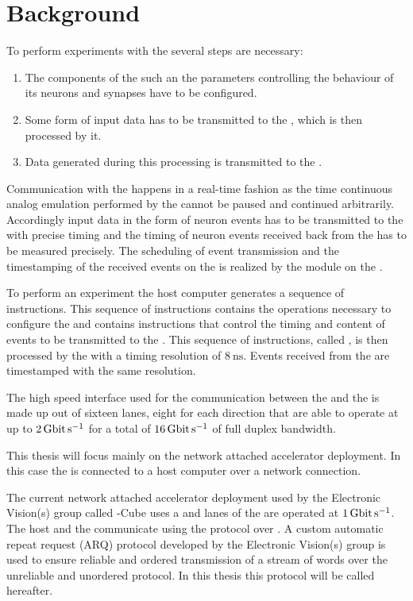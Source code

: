\section{Background}
To perform experiments with the \HICANNX{} \ASIC{} several steps are necessary:
\begin{enumerate}
\item The components of the \ASIC{} such an the parameters controlling the behaviour of its neurons and synapses have to be configured.
\item Some form of input data has to be transmitted to the \ASIC{}, which is then processed by it.
\item Data generated during this processing is transmitted to the \FPGA{}.
\end{enumerate}
Communication with the \ASIC{} happens in a real-time fashion as the time continuous analog emulation performed by the \ASIC{} cannot be paused and continued arbitrarily. Accordingly input data in the form of neuron events has to be transmitted to the \ASIC{} with precise timing and the timing of neuron events received back from the \ASIC{} has to be measured precisely.
The scheduling of event transmission and the timestamping of the received events on the \FPGA{} is realized by the \pbexec{} module on the \FPGA{}.

To perform an experiment the host computer generates a sequence of instructions. This sequence of instructions contains the operations necessary to configure the \ASIC{} and contains instructions that control the timing and content of events to be transmitted to the \ASIC{}.
This sequence of instructions, called \PlaybackProgram{}, is then processed by the \pbexec{} with a timing resolution of $\SI{8}{\nano\second}$.
Events received from the \ASIC{} are timestamped with the same resolution.

The high speed interface used for the communication between the \ASIC{} and the \FPGA{} is made up out of sixteen \LVDS{} lanes, eight for each direction that are able to operate at up to $\SI{2}{\giga\bit\per\second}$ for a total of $\SI{16}{\giga\bit\per\second}$ of full duplex bandwidth.

This thesis will focus mainly on the network attached accelerator deployment. In this case the \FPGA{} is connected to a host computer over a network connection.

The current network attached accelerator deployment used by the Electronic Vision(s) group called \BSSTwo{}-Cube\autocite{ref:bss_cube} uses a \Xilinx{}  \FPGA{} and \LVDS{} lanes of the \ASIC{} are operated at $\SI{1}{\giga\bit\per\second}$. The host and the \FPGA{} communicate using the \UDP{} protocol over \Gigabitethernet{}. A custom automatic repeat request (ARQ) protocol\autocite{ref:hostarq} developed by the Electronic Vision(s) group is used to ensure reliable and ordered transmission of a stream of \PhyWordSize{} words over the unreliable and unordered \UDP{} protocol. In this thesis this protocol will be called \HostARQ{} hereafter.

